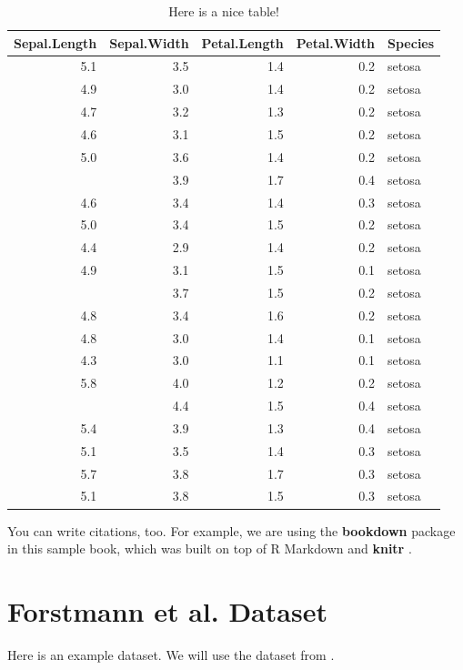 \documentclass[]{book}
\begin{document}
\begin{table}

\caption{\label{tab:nice-tab}Here is a nice table!}
\centering
\begin{tabular}[t]{rrrrl}
\toprule
Sepal.Length & Sepal.Width & Petal.Length & Petal.Width & Species\\
\midrule
5.1 & 3.5 & 1.4 & 0.2 & setosa\\
4.9 & 3.0 & 1.4 & 0.2 & setosa\\
4.7 & 3.2 & 1.3 & 0.2 & setosa\\
4.6 & 3.1 & 1.5 & 0.2 & setosa\\
5.0 & 3.6 & 1.4 & 0.2 & setosa\\
\addlinespace
5.4 & 3.9 & 1.7 & 0.4 & setosa\\
4.6 & 3.4 & 1.4 & 0.3 & setosa\\
5.0 & 3.4 & 1.5 & 0.2 & setosa\\
4.4 & 2.9 & 1.4 & 0.2 & setosa\\
4.9 & 3.1 & 1.5 & 0.1 & setosa\\
\addlinespace
5.4 & 3.7 & 1.5 & 0.2 & setosa\\
4.8 & 3.4 & 1.6 & 0.2 & setosa\\
4.8 & 3.0 & 1.4 & 0.1 & setosa\\
4.3 & 3.0 & 1.1 & 0.1 & setosa\\
5.8 & 4.0 & 1.2 & 0.2 & setosa\\
\addlinespace
5.7 & 4.4 & 1.5 & 0.4 & setosa\\
5.4 & 3.9 & 1.3 & 0.4 & setosa\\
5.1 & 3.5 & 1.4 & 0.3 & setosa\\
5.7 & 3.8 & 1.7 & 0.3 & setosa\\
5.1 & 3.8 & 1.5 & 0.3 & setosa\\
\bottomrule
\end{tabular}
\end{table}

You can write citations, too. For example, we are using the
\textbf{bookdown} package \citep{R-bookdown} in this sample book, which
was built on top of R Markdown and \textbf{knitr} \citep{xie2015}.

\chapter{Forstmann et al. Dataset}\label{forstmann-et-al.-dataset}

Here is an example dataset. We will use the dataset from
\citet{forstmann2008striatum}.
\end{document}
